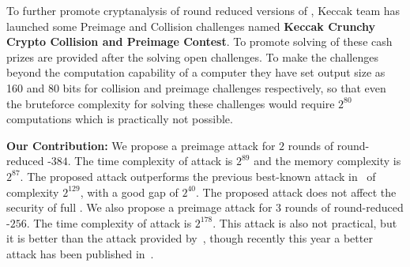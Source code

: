 \newpage
To further promote cryptanalysis of round reduced versions of \KECCAK{}, Keccak team has launched some Preimage and Collision challenges named \textbf{Keccak Crunchy Crypto Collision and Preimage Contest}. To promote solving of these cash prizes are provided after the solving open challenges. To make the challenges beyond the computation capability of a computer they have set output size as 160 and 80 bits for collision and preimage challenges respectively, so that even the bruteforce complexity for solving these challenges would require $2^{80}$ computations which is practically not possible.
\newline

\textbf{Our Contribution:} We propose a preimage attack for $2$ rounds of round-reduced \KECCAK-$384$. The time complexity of attack is $2^{89}$ and the memory complexity is $2^{87}$. The proposed attack outperforms the previous best-known attack in~\cite{guo2016linear} of complexity $2^{129}$, with a good gap of $2^{40}$. The proposed attack does not affect the security of full \KECCAK{}. We also propose a preimage attack for $3$ rounds of round-reduced \KECCAK-$256$. The time complexity of attack is $2^{178}$. This attack is also not practical, but it is better than the attack provided by~\cite{guo2016linear}, though recently this year a better attack has been published in~\cite{lipreimage}.
